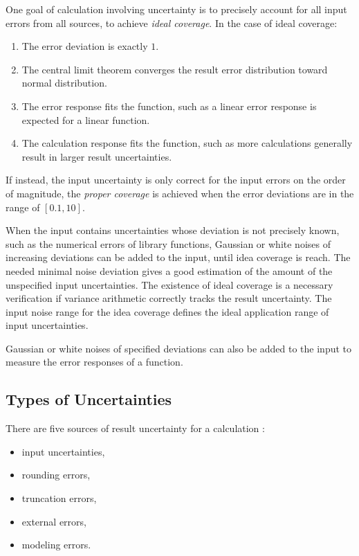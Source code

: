 \documentclass[twoside]{article}
\numberwithin{equation}{section}
\begin{document}
One goal of calculation involving uncertainty is to precisely account for all input errors from all sources, to achieve \emph{ideal coverage}.
In the case of ideal coverage:
\begin{enumerate}
\item The error deviation is exactly $1$.

\item The central limit theorem converges the result error distribution toward normal distribution.

\item The error response fits the function, such as a linear error response is expected for a linear function.

\item The calculation response fits the function, such as more calculations generally result in larger result uncertainties.

\end{enumerate}
If instead, the input uncertainty is only correct for the input errors on the order of magnitude, the \emph{proper coverage} is achieved when the error deviations are in the range of $[0.1, 10]$.

When the input contains uncertainties whose deviation is not precisely known, such as the numerical errors of library functions, Gaussian or white noises of increasing deviations can be added to the input, until idea coverage is reach.
The needed minimal noise deviation gives a good estimation of the amount of the unspecified input uncertainties.
The existence of ideal coverage is a necessary verification if variance arithmetic correctly tracks the result uncertainty.
The input noise range for the idea coverage defines the ideal application range of input uncertainties.

Gaussian or white noises of specified deviations can also be added to the input to measure the error responses of a function.



\subsection{Types of Uncertainties}

There are five sources of result uncertainty for a calculation \cite{Statistical_Methods}\cite{Numerical_Recipes}:
\begin{itemize}
\item input uncertainties,
\item rounding errors,
\item truncation errors,
\item external errors,
\item modeling errors.
\end{itemize}
\end{document}
